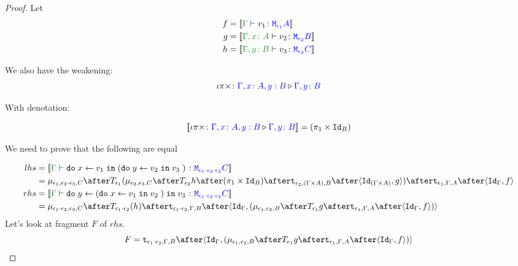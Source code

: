 \documentclass{report}
\begin{document}
\begin{framed}
\begin{proof}
        
        
        \case{\eqassociativity}
        Let
        \begin{align*}
            f ={}& \deno{\gtyperelation{v_1}{\M{\e_1}{A}}}\\
            g ={}& \deno{\typerelation{\gax}{v_2}{\M{\e_2}{B}}}\\
            h ={}& \deno{\typerelation{\gby}{v_3}{\M{\e_3}{C}}}
        \end{align*}
        
        We also have the weakening:
        \begin{equation}
            \iota\pi\times \colon {\color{blue}\Gamma, x\colon A, y: B} \triangleright {\color {blue} \Gamma, y\colon B}
        \end{equation}
        
        With denotation:
        
        \begin{equation}
            {\bf [\![}\iota\pi\times \colon {\color{blue}\Gamma, x\colon A, y: B} \triangleright {\color {blue} \Gamma, y\colon B}{\bf ]\!]} = (\pi_1 \times \texttt{Id}_{B})
        \end{equation}
        
        We need to prove that the following are equal
        
        \begin{align*}
            lhs & =  \deno{\gtyperelation{\doin{x}{v_1}{(\doin{y}{v_2}{v_3})}}{\M{\e_1\dot\e_2\dot\e_3}{C}}} \\
            & = \bind{\e_1}{\e_2\dot\e_3}{C}\after\T{
                \e_1}{(\bind{\e_2}{\e_3}{C}\after\T{\e_2}{h\after(\p \times \Id{B})}\after\tstrength{\e_2}{(\G\times A)}{B}\after\pr{\Id{(\G\times A)}}{g}
                )}\after\tstrength{\e_1}{\G}{A}\after\pr{\idg}{f}\\
                rhs &  = \deno{\gtyperelation{\doin{y}{(\doin{x}{v_1}{v_2})}{v_3}}{\M{\e_1\dot\e_2\dot\e_2}{C}}}  \\
            & = \bind{\e_1\dot\e_2}{\e_3}{C}\after\T{\e_1\dot\e_2}{(h)}\after\tstrength{\e_1\dot\e_2}{\G}{B}\after\pr{\idg}{(\bind{\e_1}{\e_2}{B}\after\T{\e_1}{g}\after\tstrength{\e_1}{\G}{A}\after\pr{\idg}{f})} \\
        \end{align*}
        Let's look at fragment $F$ of $rhs$.
        \begin{equation}
            F = \tstrength{\e_1\dot\e_2}{\G}{B}\after\pr{\idg}{(\bind{\e_1}{\e_2}{B}\after\T{\e_1}{g}\after\tstrength{\e_1}{\G}{A}\after\pr{\idg}{f})}
        \end{equation}
        

\end{proof}
\end{framed}
\end{document}
